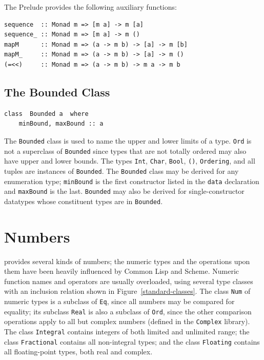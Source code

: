 The Prelude provides the following auxiliary functions: 
\bprog
{\small\begin{verbatim}
sequence  :: Monad m => [m a] -> m [a] 
sequence_ :: Monad m => [m a] -> m () 
mapM      :: Monad m => (a -> m b) -> [a] -> m [b]
mapM_     :: Monad m => (a -> m b) -> [a] -> m ()
(=<<)     :: Monad m => (a -> m b) -> m a -> m b
\end{verbatim}}
\eprog
{}
\indextt{=<<}

\subsection{The Bounded Class}
{\small\begin{verbatim}
class  Bounded a  where
    minBound, maxBound :: a
\end{verbatim}}

The \mbox{\tt Bounded} class is used to name the upper and lower limits of a
type.  \mbox{\tt Ord} is not a superclass of \mbox{\tt Bounded} since types that are not
totally ordered may also have upper and lower bounds.
The types \mbox{\tt Int}, \mbox{\tt Char}, \mbox{\tt Bool},
\mbox{\tt ()}, \mbox{\tt Ordering}, and all tuples are instances of \mbox{\tt Bounded}.  
The \mbox{\tt Bounded} class may be derived
for any enumeration type; \mbox{\tt minBound} is the first constructor listed
in the \mbox{\tt data} declaration and \mbox{\tt maxBound} is the last.  \mbox{\tt Bounded} may
also be derived for single-constructor datatypes whose constituent
types are in \mbox{\tt Bounded}.

\section{Numbers}
\label{numbers}

\Haskell{} provides several kinds of numbers; the numeric
types and the operations upon them have been heavily influenced by
Common Lisp and Scheme.
Numeric function names and operators are usually overloaded, using
several type classes with an inclusion relation shown in
Figure~\ref{standard-classes}.
The class \mbox{\tt Num} of numeric
types is a subclass of \mbox{\tt Eq}, since all numbers may be
compared for equality; its subclass \mbox{\tt Real} is also a
subclass of \mbox{\tt Ord}, since the other comparison operations
apply to all but complex numbers (defined in the \mbox{\tt Complex} library).
The class \mbox{\tt Integral} contains integers of both 
limited and unlimited range; the class
\mbox{\tt Fractional} contains all non-integral types; and
the class \mbox{\tt Floating} contains all floating-point
types, both real and complex.

